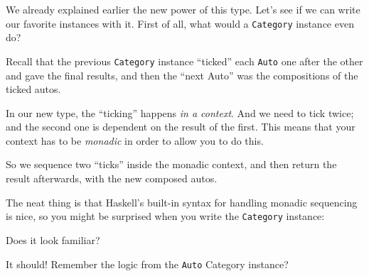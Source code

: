 \documentclass[]{article}
\newenvironment{Shaded}{}{}
\newcommand{\CommentTok}[1]{\textcolor[rgb]{0.38,0.63,0.69}{\textit{#1}}}
\newcommand{\DataTypeTok}[1]{\textcolor[rgb]{0.56,0.13,0.00}{#1}}
\newcommand{\FunctionTok}[1]{\textcolor[rgb]{0.02,0.16,0.49}{#1}}
\newcommand{\KeywordTok}[1]{\textcolor[rgb]{0.00,0.44,0.13}{\textbf{#1}}}
\newcommand{\NormalTok}[1]{#1}
\newcommand{\OperatorTok}[1]{\textcolor[rgb]{0.40,0.40,0.40}{#1}}
\newcommand{\OtherTok}[1]{\textcolor[rgb]{0.00,0.44,0.13}{#1}}
\begin{document}
We already explained earlier the new power of this type. Let's see if we can
write our favorite instances with it. First of all, what would a
\texttt{Category} instance even do?

Recall that the previous \texttt{Category} instance ``ticked'' each
\texttt{Auto} one after the other and gave the final results, and then the
``next Auto'' was the compositions of the ticked autos.

In our new type, the ``ticking'' happens \emph{in a context}. And we need to
tick twice; and the second one is dependent on the result of the first. This
means that your context has to be \emph{monadic} in order to allow you to do
this.

So we sequence two ``ticks'' inside the monadic context, and then return the
result afterwards, with the new composed autos.

The neat thing is that Haskell's built-in syntax for handling monadic sequencing
is nice, so you might be surprised when you write the \texttt{Category}
instance:

\begin{Shaded}
\end{Shaded}

Does it look familiar?

It should! Remember the logic from the \texttt{Auto} Category instance?
\end{document}
